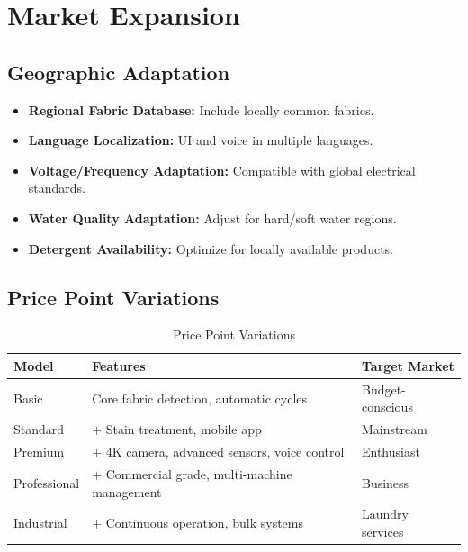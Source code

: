 \section{Market Expansion}

\subsection{Geographic Adaptation}
\begin{itemize}
    \item \textbf{Regional Fabric Database:} Include locally common fabrics.
    \item \textbf{Language Localization:} UI and voice in multiple languages.
    \item \textbf{Voltage/Frequency Adaptation:} Compatible with global electrical standards.
    \item \textbf{Water Quality Adaptation:} Adjust for hard/soft water regions.
    \item \textbf{Detergent Availability:} Optimize for locally available products.
\end{itemize}

\subsection{Price Point Variations}

\begin{table}[H]
    \centering
    \small
    \begin{tabular}{|l|l|l|}
        \hline
        \textbf{Model} & \textbf{Features} & \textbf{Target Market} \\
        \hline
        Basic & Core fabric detection, automatic cycles & Budget-conscious \\
        \hline
        Standard & + Stain treatment, mobile app & Mainstream \\
        \hline
        Premium & + 4K camera, advanced sensors, voice control & Enthusiast \\
        \hline
        Professional & + Commercial grade, multi-machine management & Business \\
        \hline
        Industrial & + Continuous operation, bulk systems & Laundry services \\
        \hline
    \end{tabular}
    \caption{Price Point Variations}
    \label{tab:price-points}
\end{table}

